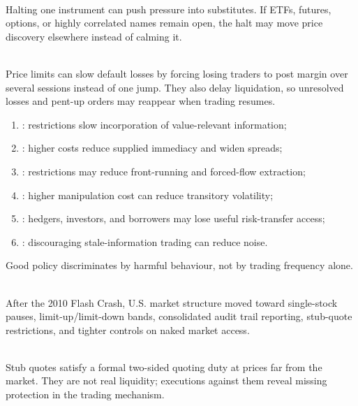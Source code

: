\begin{caveat} \\
Halting one instrument can push pressure into substitutes. If ETFs, futures, options, or highly correlated names remain open, the halt may move price discovery elsewhere instead of calming it.
\end{caveat}

\begin{mechanism} \\
Price limits can slow default losses by forcing losing traders to post margin over several sessions instead of one jump. They also delay liquidation, so unresolved losses and pent-up orders may reappear when trading resumes.
\end{mechanism}

\begin{taxonomy} 
\begin{enumerate}[label=\roman*.]
\setlength{\itemsep}{0pt}
\item {}: restrictions slow incorporation of value-relevant information;
\item {}: higher costs reduce supplied immediacy and widen spreads;
\item {}: restrictions may reduce front-running and forced-flow extraction;
\item {}: higher manipulation cost can reduce transitory volatility;
\item {}: hedgers, investors, and borrowers may lose useful risk-transfer access;
\item {}: discouraging stale-information trading can reduce noise.
\end{enumerate}
Good policy discriminates by harmful behaviour, not by trading frequency alone.
\end{taxonomy}

\begin{marketrule} \\
After the 2010 Flash Crash, U.S. market structure moved toward single-stock pauses, limit-up/limit-down bands, consolidated audit trail reporting, stub-quote restrictions, and tighter controls on naked market access.
\end{marketrule}

\begin{caveat} \\
Stub quotes satisfy a formal two-sided quoting duty at prices far from the market. They are not real liquidity; executions against them reveal missing protection in the trading mechanism.
\end{caveat}

